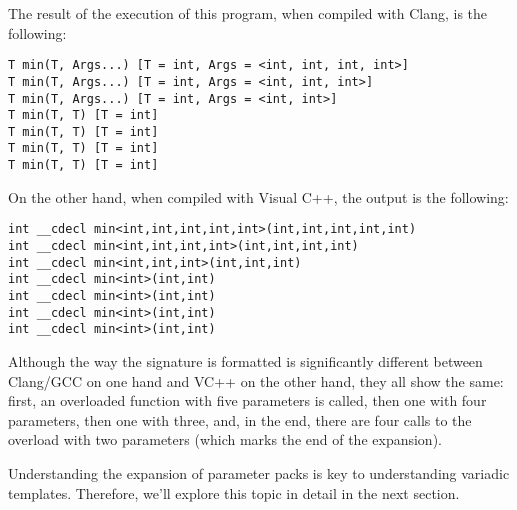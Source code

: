 The result of the execution of this program, when compiled with Clang, is the following:

\begin{lstlisting}[style=styleCXX]
T min(T, Args...) [T = int, Args = <int, int, int, int>]
T min(T, Args...) [T = int, Args = <int, int, int>]
T min(T, Args...) [T = int, Args = <int, int>]
T min(T, T) [T = int]
T min(T, T) [T = int]
T min(T, T) [T = int]
T min(T, T) [T = int]
\end{lstlisting}

On the other hand, when compiled with Visual C++, the output is the following:

\begin{lstlisting}[style=styleCXX]
int __cdecl min<int,int,int,int,int>(int,int,int,int,int)
int __cdecl min<int,int,int,int>(int,int,int,int)
int __cdecl min<int,int,int>(int,int,int)
int __cdecl min<int>(int,int)
int __cdecl min<int>(int,int)
int __cdecl min<int>(int,int)
int __cdecl min<int>(int,int)
\end{lstlisting}

Although the way the signature is formatted is significantly different between Clang/GCC on one hand and VC++ on the other hand, they all show the same: first, an overloaded function with five parameters is called, then one with four parameters, then one with three, and, in the end, there are four calls to the overload with two parameters (which marks the end of the expansion).

Understanding the expansion of parameter packs is key to understanding variadic templates. Therefore, we'll explore this topic in detail in the next section.



